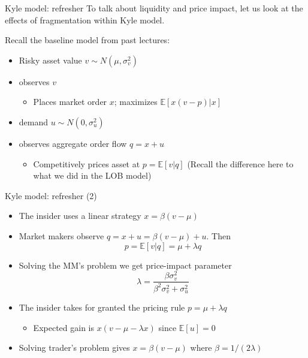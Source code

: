\documentclass[english,10pt
,aspectratio=169
]{beamer}
\begin{document}
\begin{frame}{Kyle model: refresher}
	To talk about liquidity and price impact, let us look at the effects of fragmentation within \alert{Kyle model}.
	
	Recall the baseline model from past lectures:
	\begin{itemize}
		\item Risky asset value $v \sim N(\mu,\sigma^{2}_{v})$
		\item {} observes $v$
		\begin{itemize}
			\item Places market order $x$; maximizes $\mathbb{E}[x(v-p)|x]$
		\end{itemize}
		\item {} demand $u \sim N(0, \sigma^{2}_{u})$
		\item {} observes aggregate order flow $q = x + u$
		\begin{itemize}
			\item Competitively prices asset at $p = \mathbb{E}[v|q]$
			(Recall the difference here to what we did in the LOB model)
		\end{itemize}
	\end{itemize}
\end{frame}


\begin{frame}{Kyle model: refresher (2)}
	\begin{itemize}
		\item The insider uses a linear strategy $x=\beta(v-\mu)$
		\item Market makers observe $q=x+u=\beta(v-\mu) + u$. Then
		\[
		p=\mathbb{E}[v|q]=\mu + \lambda q
		\]
		\item Solving the MM's problem we get price-impact parameter
		\[
		\lambda = \frac{\beta \sigma^{2}_{v}}{\beta^{2} \sigma^{2}_{v}+\sigma^{2}_{u}}
		\]
		\item The insider takes for granted the pricing rule $p=\mu+\lambda q$
		\begin{itemize}
			\item Expected gain is $x(v-\mu-\lambda x)$ since $\mathbb{E}[u]=0$
		\end{itemize}
		\item Solving trader's problem gives $x=\beta(v-\mu)$ where $\beta=1/(2\lambda)$
	\end{itemize}
\end{frame}
\end{document}
